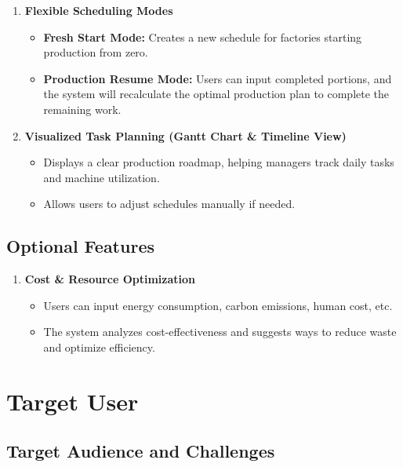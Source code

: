 \begin{enumerate}[leftmargin=80pt]
    \item \textbf{Flexible Scheduling Modes}  
    \begin{itemize}
        \item \textbf{Fresh Start Mode:} Creates a new schedule for factories starting production from zero.  
        \item \textbf{Production Resume Mode:} Users can input completed portions, and the system will recalculate the optimal production plan to complete the remaining work.  
    \end{itemize}

    \item \textbf{Visualized Task Planning (Gantt Chart \& Timeline View)}
    \begin{itemize}
        \item Displays a clear production roadmap, helping managers track daily tasks and machine utilization.
        \item Allows users to adjust schedules manually if needed.
    \end{itemize}
\end{enumerate}

\subsection{Optional Features}
\label{subsection:optional features}
\begin{enumerate}[leftmargin=80pt]
    \item \textbf{Cost \& Resource Optimization}
    \begin{itemize}
        \item Users can input energy consumption, carbon emissions, human cost, etc.
        \item The system analyzes cost-effectiveness and suggests ways to reduce waste and optimize efficiency.
    \end{itemize}
\end{enumerate}



\section{Target User}
\label{section:target-user}

\subsection{Target Audience and Challenges}

